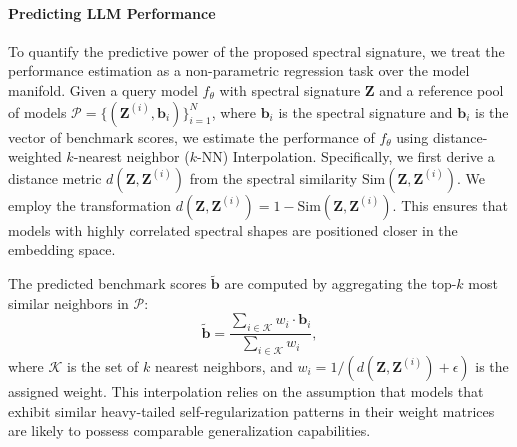 








\noindent\paragraph{Predicting LLM Performance}\label{sec:method_pred_performance}


To quantify the predictive power of the proposed spectral signature, we treat the performance estimation as a non-parametric regression task over the model manifold. Given a query model $f_{\theta}$ with spectral signature $\mathbf{Z}$ and a reference pool of models $\mathcal{P} = \{(\mathbf{Z}^{(i)}, \mathbf{b}_i)\}_{i=1}^N$, where $\mathbf{b}_i$ is the spectral signature and $\mathbf{b}_i$ is the vector of benchmark scores, we estimate the performance of $f_{\theta}$ using distance-weighted $k$-nearest neighbor ($k$-NN) Interpolation.
Specifically, we first derive a distance metric $d(\mathbf{Z}, \mathbf{Z}^{(i)})$ from the spectral similarity $\mathrm{Sim}(\mathbf{Z}, \mathbf{Z}^{(i)})$. 
%
We employ the transformation $d(\mathbf{Z}, \mathbf{Z}^{(i)})= 1 - \mathrm{Sim}(\mathbf{Z}, \mathbf{Z}^{(i)})$. This ensures that models with highly correlated spectral shapes are positioned closer in the embedding space.

The predicted benchmark scores $\tilde{\mathbf{b}}$ are computed by aggregating the top-$k$ most similar neighbors in $\mathcal{P}$:
%
$$\tilde{\mathbf{b}} = \frac{\sum_{i \in \mathcal{K}} w_i \cdot \mathbf{b}_i}{\sum_{i \in \mathcal{K}} w_i},$$
%
where $\mathcal{K}$ is the set of $k$ nearest neighbors, and $w_i = 1 / (d(\mathbf{Z}, \mathbf{Z}^{(i)}) + \epsilon)$ is the assigned weight. This interpolation relies on the assumption that models that exhibit similar heavy-tailed self-regularization patterns in their weight matrices are likely to possess comparable generalization capabilities.

